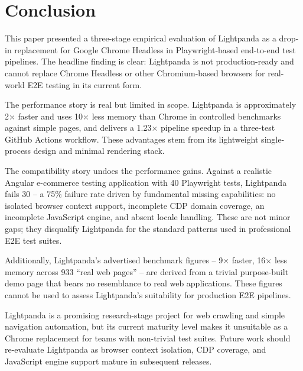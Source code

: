 \section{Conclusion}
\label{sec:conclusion}

This paper presented a three-stage empirical evaluation of Lightpanda as a drop-in replacement for Google Chrome Headless in Playwright-based end-to-end test pipelines. The headline finding is clear: Lightpanda is not production-ready and cannot replace Chrome Headless or other Chromium-based browsers for real-world E2E testing in its current form.

The performance story is real but limited in scope. Lightpanda is approximately 2$\times$ faster and uses 10$\times$ less memory than Chrome in controlled benchmarks against simple pages, and delivers a 1.23$\times$ pipeline speedup in a three-test GitHub Actions workflow. These advantages stem from its lightweight single-process design and minimal rendering stack.

The compatibility story undoes the performance gains. Against a realistic Angular e-commerce testing application with 40 Playwright tests, Lightpanda fails 30 -- a 75\% failure rate driven by fundamental missing capabilities: no isolated browser context support, incomplete CDP domain coverage, an incomplete JavaScript engine, and absent locale handling. These are not minor gaps; they disqualify Lightpanda for the standard patterns used in professional E2E test suites.

Additionally, Lightpanda's advertised benchmark figures -- 9$\times$ faster, 16$\times$ less memory across 933 ``real web pages'' -- are derived from a trivial purpose-built demo page that bears no resemblance to real web applications. These figures cannot be used to assess Lightpanda's suitability for production E2E pipelines.

Lightpanda is a promising research-stage project for web crawling and simple navigation automation, but its current maturity level makes it unsuitable as a Chrome replacement for teams with non-trivial test suites. Future work should re-evaluate Lightpanda as browser context isolation, CDP coverage, and JavaScript engine support mature in subsequent releases.
